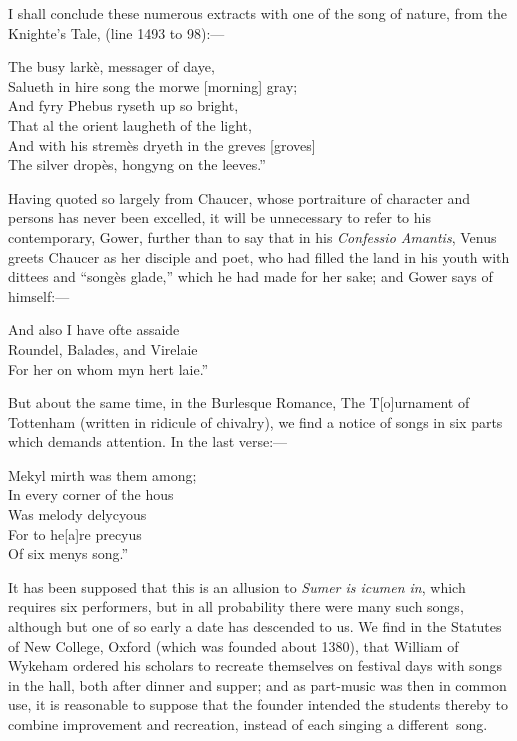 
\renewcommand\rectoheader{gower.--richard ii.}
I shall conclude these numerous extracts with one of the song of nature, from
the Knighte’s Tale, (line 1493 to 98):—

\settowidth{\versewidth}{And with his stremès dryeth in the greves [groves]}
\begin{scverse}
The busy larkè, messager of daye,\\
Salueth in hire song the morwe [morning] gray;\\
And fyry Phebus ryseth up so bright,\\
That al the orient laugheth of the light,\\
And with his stremès dryeth in the greves [groves]\\
The silver dropès, hongyng on the leeves.”
\end{scverse}
Having quoted so largely from Chaucer, whose portraiture of character and
persons has never been excelled, it will be unnecessary to refer to his contemporary, Gower, further than to say that in his \textit{Confessio Amantis}, Venus greets
Chaucer as her disciple and poet, who had filled the land in his youth with
dittees and “songès glade,” which he had made for her sake; and Gower says of
himself:—
\settowidth{\versewidth}{For her on whom myn hert laie.”}
\begin{scverse}
And also I have ofte assaide\\
Roundel, Balades, and Virelaie\\
For her on whom myn hert laie.”
\end{scverse}
But about the same time, in the Burlesque Romance, The T[o]urnament of
Tottenham (written in ridicule of chivalry), we find a notice of songs in six parts
which demands attention. In the last verse:—
\settowidth{\versewidth}{Mekyl mirth was them among;}
\begin{scverse}
Mekyl mirth was them among;\\
In every corner of the hous\\
Was melody delycyous\\
For to he[a]re precyus\\
\vin\vin Of six menys song.”
\end{scverse}

It has been supposed that this is an allusion to \textit{Sumer is icumen in}, which
requires six performers, but in all probability there were many such songs,
although but one of so early a date has descended to us. We find in the Statutes
of New College, Oxford (which was founded about 1380), that William of
Wykeham ordered his scholars to recreate themselves on festival days with songs
in the hall, both after dinner and supper; and as part-music was then in common
use, it is reasonable to suppose that the founder intended the students thereby to
combine improvement and recreation, instead of each singing a different~song.

